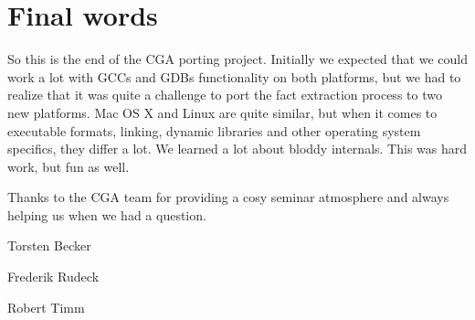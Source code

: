 
\section{Final words} So this is the end of the CGA porting project. Initially we expected that we could work a lot with GCCs and GDBs functionality on both platforms, but we had to realize that it was quite a challenge to port the fact extraction process to two new platforms.  Mac OS X and Linux are quite similar, but when it comes to executable formats, linking, dynamic libraries and other operating system specifics, they differ a lot. We learned a lot about bloddy internals. This was hard work, but fun as well. 

Thanks to the CGA team for providing a cosy seminar atmosphere and always helping us when we had a question.

Torsten Becker

Frederik Rudeck

Robert Timm 
